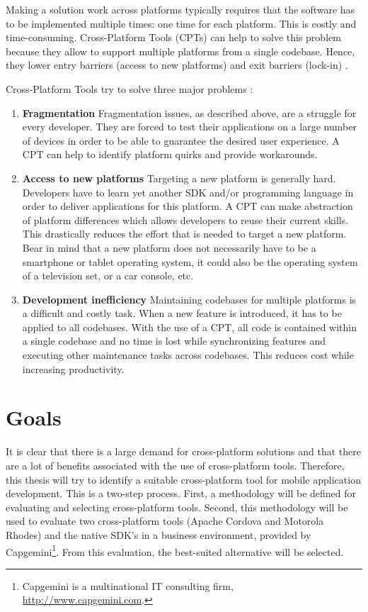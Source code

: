 Making a solution work across platforms typically requires that the software has to be implemented multiple times: one time for each platform. This is costly and time-consuming. Cross-Platform Tools (CPTs) can help to solve this problem because they allow to support multiple platforms from a single codebase. Hence, they lower entry barriers (access to new platforms) and exit barriers (lock-in) \cite{VMCPT:2012}. 

Cross-Platform Tools try to solve three major problems \cite{VMCPT:2012}: 

\begin{enumerate}
    \item \textbf{Fragmentation} Fragmentation issues, as described above, are a struggle for every developer. They are forced to test their applications on a large number of devices in order to be able to guarantee the desired user experience. A CPT can help to identify platform quirks and provide workarounds. 
    \item \textbf{Access to new platforms} Targeting a new platform is generally hard. Developers have to learn yet another SDK and/or programming language in order to deliver applications for this platform. A CPT can make abstraction of platform differences which allows developers to reuse their current skills. This drastically reduces the effort that is needed to target a new platform. Bear in mind that a new platform does not necessarily have to be a smartphone or tablet operating system, it could also be the operating system of a television set, or a car console, etc.
    \item \textbf{Development inefficiency} Maintaining codebases for multiple platforms is a difficult and costly task. When a new feature is introduced, it has to be applied to all codebases. With the use of a CPT, all code is contained within a single codebase and no time is lost while synchronizing features and executing other maintenance tasks across codebases. This reduces cost while increasing productivity. 
\end{enumerate}

\section{Goals}

It is clear that there is a large demand for cross-platform solutions and that there are a lot of benefits associated with the use of cross-platform tools. Therefore, this thesis will try to identify a suitable cross-platform tool for mobile application development. This is a two-step process. First, a methodology will be defined for evaluating and selecting cross-platform tools. Second, this methodology will be used to evaluate two cross-platform tools (Apache Cordova and Motorola Rhodes) and the native SDK's in a business environment, provided by Capgemini\footnote{Capgemini is a multinational IT consulting firm, \url{http://www.capgemini.com}.}. From this evaluation, the best-suited alternative will be selected. 